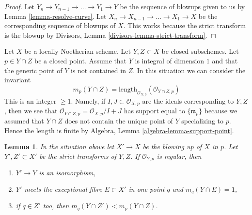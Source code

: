 \documentclass{stacks-project}
\theoremstyle{plain}
\newtheorem{lemma}[subsection]{Lemma}
\theoremstyle{definition}
\theoremstyle{remark}
\numberwithin{equation}{subsection}
\begin{document}
\begin{proof}
Let $Y_n \to Y_{n - 1} \to \ldots \to Y_1 \to Y$ be the sequence of
blowups given to us by Lemma \ref{lemma-resolve-curve}. Let
$X_n \to X_{n - 1} \to \ldots \to X_1 \to X$ be the corresponding
sequence of blowups of $X$. This works because the strict transform
is the blowup by Divisors, Lemma \ref{divisors-lemma-strict-transform}.
\end{proof}

\noindent
Let $X$ be a locally Noetherian scheme. Let $Y, Z \subset X$ be
closed subschemes. Let $p \in Y \cap Z$ be a closed point. Assume
that $Y$ is integral of dimension $1$ and that the generic point of $Y$
is not contained in $Z$. In this situation we can
consider the invariant
\begin{equation}
\label{equation-multiplicity}
m_p(Y \cap Z) =
\text{length}_{\mathcal{O}_{X, p}}(\mathcal{O}_{Y \cap Z, p})
\end{equation}
This is an integer $\geq 1$. Namely, if $I, J \subset \mathcal{O}_{X, p}$
are the ideals corresponding to $Y, Z$, then we see that
$\mathcal{O}_{Y \cap Z, p} = \mathcal{O}_{X, p}/I + J$
has support equal to $\{\mathfrak m_p\}$ because we assumed that
$Y \cap Z$ does not contain the unique point of $Y$ specializing to $p$.
Hence the length is finite by
Algebra, Lemma \ref{algebra-lemma-support-point}.

\begin{lemma}
\label{lemma-blowup-nonsingular-curves-meeting-at-point}
In the situation above let $X' \to X$ be the blowing up of $X$ in $p$.
Let $Y', Z' \subset X'$ be the strict transforms of $Y, Z$.
If $\mathcal{O}_{Y, p}$ is regular, then
\begin{enumerate}
\item $Y' \to Y$ is an isomorphism,
\item $Y'$ meets the exceptional fibre $E \subset X'$ in one point
$q$ and $m_q(Y \cap E) = 1$,
\item if $q \in Z'$ too, then $m_q(Y \cap Z') < m_p(Y \cap Z)$.
\end{enumerate}
\end{lemma}
\end{document}
